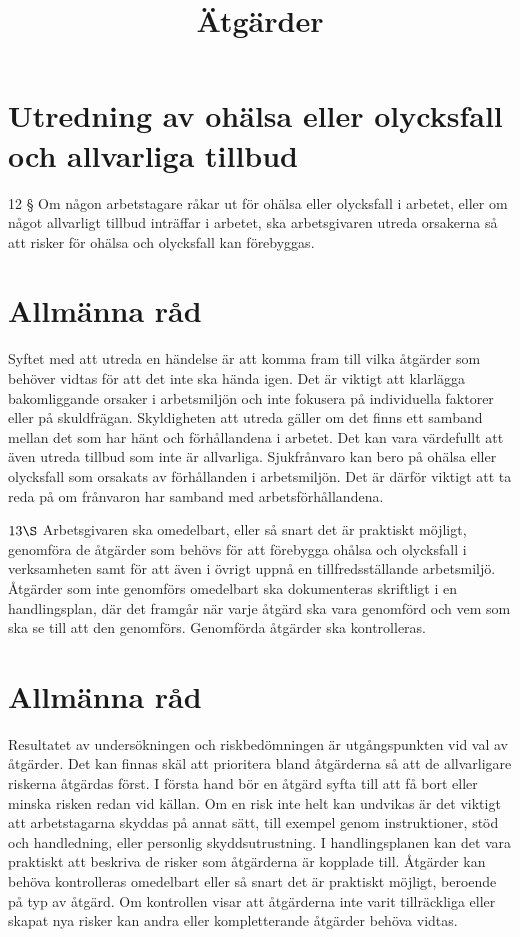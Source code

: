 \section*{Utredning av ohälsa eller olycksfall och allvarliga tillbud}
12 § Om någon arbetstagare råkar ut för ohälsa eller olycksfall i arbetet, eller om något allvarligt tillbud inträffar i arbetet, ska arbetsgivaren utreda orsakerna så att risker för ohälsa och olycksfall kan förebyggas.
\section*{Allmänna råd}
Syftet med att utreda en händelse är att komma fram till vilka åtgärder som behöver vidtas för att det inte ska hända igen. Det är viktigt att klarlägga bakomliggande orsaker i arbetsmiljön och inte fokusera på individuella faktorer eller på skuldfrägan.
Skyldigheten att utreda gäller om det finns ett samband mellan det som har hänt och förhållandena i arbetet. Det kan vara värdefullt att även utreda tillbud som inte är allvarliga.
Sjukfrånvaro kan bero på ohälsa eller olycksfall som orsakats av förhållanden i arbetsmiljön. Det är därför viktigt att ta reda på om frånvaron har samband med arbetsförhållandena.

\title{
Ätgärder
}
\(13 \S\) Arbetsgivaren ska omedelbart, eller så snart det är praktiskt möjligt, genomföra de åtgärder som behövs för att förebygga ohålsa och olycksfall i verksamheten samt för att även i övrigt uppnå en tillfredsställande arbetsmiljö.
Åtgärder som inte genomförs omedelbart ska dokumenteras skriftligt i en handlingsplan, där det framgår när varje åtgärd ska vara genomförd och vem som ska se till att den genomförs. Genomförda åtgärder ska kontrolleras.
\section*{Allmänna råd}
Resultatet av undersökningen och riskbedömningen är utgångspunkten vid val av åtgärder. Det kan finnas skäl att prioritera bland åtgärderna så att de allvarligare riskerna åtgärdas först.
I första hand bör en åtgärd syfta till att få bort eller minska risken redan vid källan. Om en risk inte helt kan undvikas är det viktigt att arbetstagarna skyddas på annat sätt, till exempel genom instruktioner, stöd och handledning, eller personlig skyddsutrustning.
I handlingsplanen kan det vara praktiskt att beskriva de risker som åtgärderna är kopplade till.
Åtgärder kan behöva kontrolleras omedelbart eller så snart det är praktiskt möjligt, beroende på typ av åtgärd. Om kontrollen visar att åtgärderna inte varit tillräckliga eller skapat nya risker kan andra eller kompletterande åtgärder behöva vidtas.
